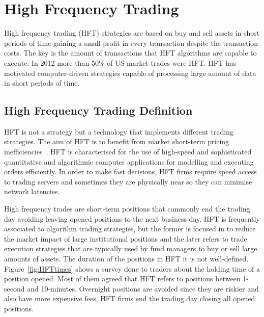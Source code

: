 \chapter{High Frequency Trading}

\vspace{0.5cm} 

High frequency trading (HFT) strategies are based on buy and sell assets in
short periods of time gaining a small profit in every transaction despite the transaction costs. The key is
the amount of transactions that HFT algorithms are capable to execute. 
In 2012 more than 50\% of US market trades were HFT.  HFT has
motivated computer-driven strategies capable of processing large amount of data
in short periods of time. 


\section{High Frequency Trading Definition}

HFT is not a strategy but a technology that implements different
trading strategies. The aim of HFT is to benefit from market short-term pricing
inefficiencies~\cite{chlistalla2011}. HFT is characterised for the use of
high-speed and sophisticated quantitative and algorithmic computer applications
for modelling and executing orders efficiently. In order to make fast decisions,
HFT firms require speed access to trading servers and sometimes they are
physically near so they can minimise network latencies.

High frequency trades are short-term positions that commonly end the trading
day avoiding leaving opened positions to the next business day. HFT is
frequently associated to algorithm trading strategies, but the former is focused
in to reduce the market impact of large institutional positions and the later refers to trade execution strategies that are typically used by fund managers to buy or sell large amounts of assets. The duration of the positions in HFT it is not well-defined. Figure~\ref{fig:HFTtimes} shows a survey done to traders about the holding time
of a position opened. Most of them agreed that HFT refers to positions between
1-second and 10-minutes. Overnight positions are avoided since they are
riskier and also have more expensive fees, HFT firms end the trading day closing all
opened positions.

